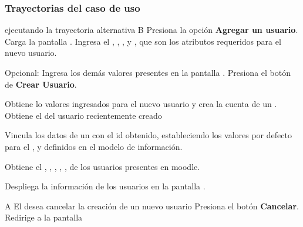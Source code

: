 \clearpage
\subsubsection{Trayectorias del caso de uso}

\begin{UCtrayectoria}%
%
   ejecutando la trayectoria alternativa B
  \Actor Presiona la opción {\bf Agregar un usuario}.
  \Sistema Carga la pantalla .
  \Actor Ingresa el , , 
         ,  y
         , que son los atributos requeridos para el nuevo
         usuario.

  \Actor Opcional: Ingresa los demás valores presentes en la pantalla .
  \Actor Presiona el botón de {\bf Crear Usuario}. 

  \Sistema Obtiene lo valores ingresados para el nuevo usuario y crea la cuenta de un
           . 
  \Sistema Obtiene el  del usuario recientemente creado 

  \Sistema Vincula los datos de un  con el id obtenido, estableciendo los
           valores por defecto para el , 
           y  definidos en el modelo de información. 

  \Sistema Obtiene el , , 
           , , ,
            de los usuarios presentes en moodle.

  \Sistema Despliega la información de los usuarios en la pantalla .
\end{UCtrayectoria}


\begin{UCtrayectoriaA}{A}{%
El  desea cancelar la creación de un nuevo usuario
}
  \Actor Presiona el botón {\bf Cancelar}.
  \Sistema Redirige a la pantalla 
\end{UCtrayectoriaA}


